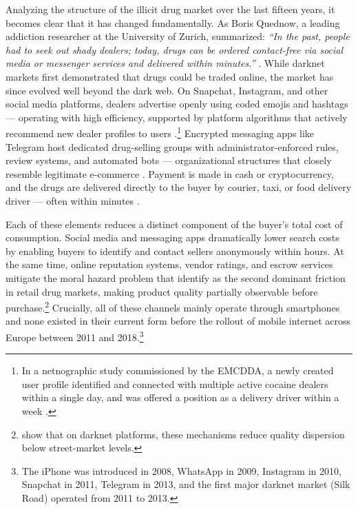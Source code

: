 \documentclass[12pt, a4paper]{article}
\begin{document}
Analyzing the structure of the illicit drug market over the last fifteen years, it becomes clear that it has changed fundamentally. As Boris Quednow, a leading addiction researcher at the University of Zurich, summarized: \textit{``In the past, people had to seek out shady dealers; today, drugs can be ordered contact-free via social media or messenger services and delivered within minutes.''} \citep{quednow_uzh_2025}. While darknet markets first demonstrated that drugs could be traded online, the market has since evolved well beyond the dark web. On Snapchat, Instagram, and other social media platforms, dealers advertise openly using coded emojis and hashtags --- operating with high efficiency, supported by platform algorithms that actively recommend new dealer profiles to users \citep{demant_emcdda_2023}.\footnote{In a netnographic study commissioned by the EMCDDA, a newly created user profile identified and connected with multiple active cocaine dealers within a single day, and was offered a position as a delivery driver within a week \citep{demant_emcdda_2023}.} Encrypted messaging apps like Telegram host dedicated drug-selling groups with administrator-enforced rules, review systems, and automated bots --- organizational structures that closely resemble legitimate e-commerce \citep{dewey_2024_telegram}. Payment is made in cash or cryptocurrency, and the drugs are delivered directly to the buyer by courier, taxi, or food delivery driver --- often within minutes \citep{moyle_2019_drugsforsale}.

Each of these elements reduces a distinct component of the buyer's total cost of consumption. Social media and messaging apps dramatically lower search costs by enabling buyers to identify and contact sellers anonymously within hours. At the same time, online reputation systems, vendor ratings, and escrow services mitigate the moral hazard problem that \citet{galenianos_2017} identify as the second dominant friction in retail drug markets, making product quality partially observable before purchase.\footnote{\citet{bhaskar_2019} show that on darknet platforms, these mechanisms reduce quality dispersion below street-market levels.} Crucially, all of these channels mainly operate through smartphones and none existed in their current form before the rollout of mobile internet across Europe between 2011 and 2018.\footnote{The iPhone was introduced in 2008, WhatsApp in 2009, Instagram in 2010, Snapchat in 2011, Telegram in 2013, and the first major darknet market (Silk Road) operated from 2011 to 2013.}
\end{document}
